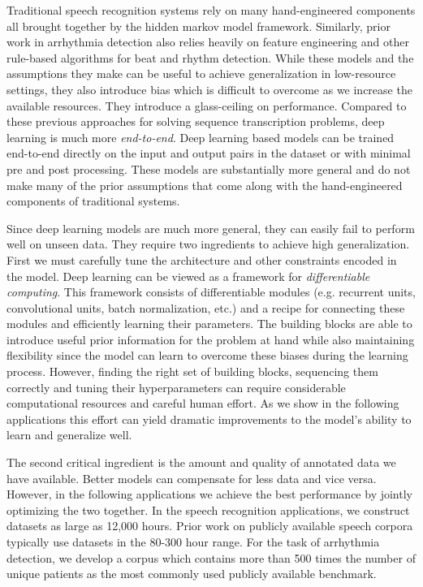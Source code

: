 Traditional speech recognition systems rely on many hand-engineered components
all brought together by the hidden markov model framework. Similarly, prior
work in arrhythmia detection also relies heavily on feature engineering and
other rule-based algorithms for beat and rhythm detection. While these models
and the assumptions they make can be useful to achieve generalization in
low-resource settings, they also introduce bias which is difficult to overcome
as we increase the available resources. They introduce a glass-ceiling on
performance.  Compared to these previous approaches for solving sequence
transcription problems, deep learning is much more {\it end-to-end}. Deep
learning based models can be trained end-to-end directly on the input and
output pairs in the dataset or with minimal pre and post processing. These
models are substantially more general and do not make many of the prior
assumptions that come along with the hand-engineered components of traditional
systems.

Since deep learning models are much more general, they can easily fail to
perform well on unseen data. They require two ingredients to achieve high
generalization. First we must carefully tune the architecture and other
constraints encoded in the model. Deep learning can be viewed as a framework
for {\it differentiable computing}. This framework consists of differentiable
modules (e.g. recurrent units, convolutional units, batch normalization, etc.)
and a recipe for connecting these modules and efficiently learning their
parameters.  The building blocks are able to introduce useful prior information
for the problem at hand while also maintaining flexibility since the model can
learn to overcome these biases during the learning process. However, finding
the right set of building blocks, sequencing them correctly and tuning their
hyperparameters can require considerable computational resources and careful
human effort. As we show in the following applications this effort can yield
dramatic improvements to the model's ability to learn and generalize well.

The second critical ingredient is the amount and quality of annotated data we
have available. Better models can compensate for less data and vice versa.
However, in the following applications we achieve the best performance by
jointly optimizing the two together. In the speech recognition applications, we
construct datasets as large as 12,000 hours. Prior work on publicly available
speech corpora typically use datasets in the 80-300 hour range. For the task of
arrhythmia detection, we develop a corpus which contains more than 500 times
the number of unique patients as the most commonly used publicly available
benchmark.

